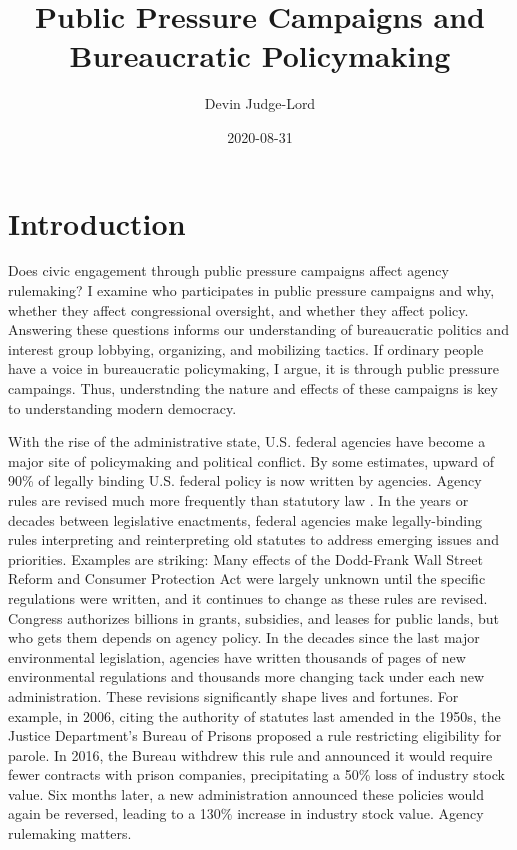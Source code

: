 \documentclass[
]{book}
\title{Public Pressure Campaigns and Bureaucratic Policymaking}
\author{Devin Judge-Lord}
\date{2020-08-31}
\begin{document}
\maketitle

{
\setcounter{tocdepth}{1}
\tableofcontents
}
\hypertarget{introduction}{%
\chapter*{Introduction}\label{introduction}}

Does civic engagement through public pressure campaigns affect agency rulemaking? I examine who participates in public pressure campaigns and why, whether they affect congressional oversight, and whether they affect policy. Answering these questions informs our understanding of bureaucratic politics and interest group lobbying, organizing, and mobilizing tactics. If ordinary people have a voice in bureaucratic policymaking, I argue, it is through public pressure campaings. Thus, understnding the nature and effects of these campaigns is key to understanding modern democracy.

With the rise of the administrative state, U.S. federal agencies have
become a major site of policymaking and political conflict. By some
estimates, upward of 90\% of legally binding U.S. federal policy is now
written by agencies. Agency rules are revised much more frequently than
statutory law \citep{Wagner2017}. In the years or decades between
legislative enactments, federal agencies make legally-binding rules
interpreting and reinterpreting old statutes to address emerging issues
and priorities. Examples are striking: Many effects of the Dodd-Frank Wall
Street Reform and Consumer Protection Act were largely unknown until the
specific regulations were written, and it continues to change as these
rules are revised. Congress authorizes billions in grants, subsidies, and
leases for public lands, but who gets them depends on agency policy. In
the decades since the last major environmental legislation, agencies
have written thousands of pages of new environmental regulations and
thousands more changing tack under each new administration. These
revisions significantly shape lives and fortunes. For example, in 2006,
citing the authority of statutes last amended in the 1950s, the Justice
Department's Bureau of Prisons proposed a rule restricting eligibility
for parole. In 2016, the Bureau withdrew this rule and announced it
would require fewer contracts with prison companies,
precipitating a 50\% loss of industry stock value. Six months later, a
new administration announced these policies would again be reversed,
leading to a 130\% increase in industry stock value. Agency rulemaking
matters.
\end{document}
